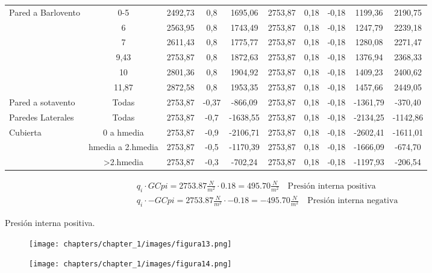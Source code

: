 \begin{enumerate}
\begin{itemize}
\begin{table}[H]
\begin{center}
{\begin{tabular}{lccccccccc}
Pared a Barlovento 	&0-5				&2492,73	&0,8	&1695,06		&2753,87	&0,18	&-0,18	&1199,36	&2190,75\\
		   			&6					&2563,95	&0,8	&1743,49		&2753,87	&0,18	&-0,18	&1247,79	&2239,18\\
		   			&7					&2611,43	&0,8	&1775,77		&2753,87	&0,18	&-0,18	&1280,08	&2271,47\\
	          		&9,43				&2753,87	&0,8	&1872,63		&2753,87	&0,18	&-0,18	&1376,94	&2368,33\\
	          		&10					&2801,36	&0,8	&1904,92		&2753,87	&0,18	&-0,18	&1409,23	&2400,62\\
	         		&11,87				&2872,58	&0,8	&1953,35		&2753,87	&0,18	&-0,18	&1457,66	&2449,05\\  \midrule
Pared a sotavento 	&Todas				&2753,87	&-0,37	&-866,09		&2753,87	&0,18	&-0,18	&-1361,79	&-370,40\\  \midrule
Paredes Laterales 	&Todas				&2753,87	&-0,7	&-1638,55		&2753,87	&0,18	&-0,18	&-2134,25	&-1142,86\\  \midrule
Cubierta	  		&0 a hmedia			&2753,87	&-0,9	&-2106,71		&2753,87	&0,18	&-0,18	&-2602,41	&-1611,01\\
					&hmedia a 2.hmedia	&2753,87	&-0,5	&-1170,39		&2753,87	&0,18	&-0,18	&-1666,09	&-674,70\\
					&>2.hmedia			&2753,87	&-0,3	&-702,24		&2753,87	&0,18	&-0,18	&-1197,93	&-206,54\\ \bottomrule
		\end{tabular}}
    \end{center}
\end{table}

\begin{align*}
&q_i \cdot GCpi = 2753.87\frac{N}{m^2} \cdot 0.18 = 495.70\frac{N}{m^2} \quad\text{Presión interna positiva} \\
&q_i \cdot -GCpi = 2753.87\frac{N}{m^2} \cdot -0.18 = -495.70\frac{N}{m^2} \quad\text{Presión interna negativa}
\end{align*}

\newpage
Presión interna positiva.\\
\begin{figure}[H]
\begin{center}
     \texttt{[image: chapters/chapter\_1/images/figura13.png]}
\end{center}
\end{figure}

\begin{figure}[H]
\begin{center}
     \texttt{[image: chapters/chapter\_1/images/figura14.png]}
\end{center}
\end{figure}


\end{itemize}
\end{enumerate}
